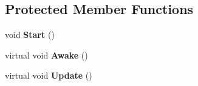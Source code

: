 \subsection*{Protected Member Functions}
\begin{DoxyCompactItemize}
\item 
void {\bfseries Start} ()\hypertarget{class_object_message_handler_base_a57747912006f83b71934380db0b6f584}{}\label{class_object_message_handler_base_a57747912006f83b71934380db0b6f584}

\item 
virtual void {\bfseries Awake} ()\hypertarget{class_object_message_handler_base_a064669a23bc110889acbe54f22edee4d}{}\label{class_object_message_handler_base_a064669a23bc110889acbe54f22edee4d}

\item 
virtual void {\bfseries Update} ()\hypertarget{class_object_message_handler_base_aa1b4c76e208448c6071927107764edcf}{}\label{class_object_message_handler_base_aa1b4c76e208448c6071927107764edcf}

\end{DoxyCompactItemize}
